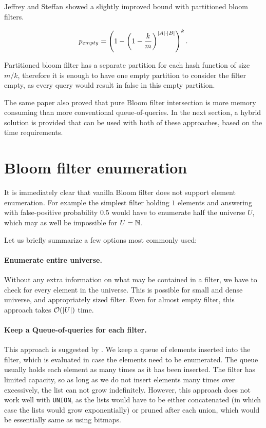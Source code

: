 Jeffrey and Steffan \cite{Jeffrey2011} showed a slightly improved bound with
partitioned bloom filters.

\begin{align*}
	p_{empty} = \left(1 - \left( 1 - {k \over m}\right)^{|A|\cdot |B|}\right)^k \mathrm{.}
\end{align*}

Partitioned bloom filter has a separate partition for each hash function of size
$m/k$, therefore it is enough to have one empty partition to consider the filter
empty, as every query would result in false in this empty partition.

The same paper also proved that pure Bloom filter intersection is more
memory consuming than more conventional queue-of-queries. In the next section,
a hybrid solution is provided that can be used with both of these approaches,
based on the time requirements.

\section{Bloom filter enumeration}

It is immediately clear that vanilla Bloom filter does not support element
enumeration. For example the simplest filter holding $1$ elements and
answering with false-positive probability $0.5$ would have to enumerate half the
universe $U$, which may as well be impossible for $U=\mathbb{N}$.

Let us briefly summarize a few options most commonly used:

\paragraph{Enumerate entire universe.} Without any extra information on what
may be contained in a filter, we have to check for every element in the
universe. This is possible for small and dense universe, and appropriately sized filter.
Even for almost empty filter, this approach takes $\mathcal{O}(|U|)$ time.

\paragraph{Keep a Queue-of-queries for each filter.} This approach is suggested
by \cite{Jeffrey2011}. We keep a queue of elements inserted into the filter,
which is evaluated in case the elements need to be enumerated. The queue usually
holds each element as many times as it has been inserted. The filter has
limited capacity, so as long as we do not insert elements many times over
excessively, the list can not grow indefinitely. However, this approach does not
work well with {\tt UNION}, as the lists would have to be either concatenated
(in which case the lists would grow exponentially) or pruned after each union,
which would be essentially same as using bitmaps.

